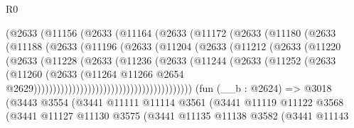 \begin{lexlean}{R0}
\begin{coremodule}
                          (@2633
                            (@11156
                              (@2633
                                (@11164
                                  (@2633
                                    (@11172
                                      (@2633
                                        (@11180
                                          (@2633
                                            (@11188
                                              (@2633
                                                (@11196
                                                  (@2633
                                                    (@11204
                                                      (@2633
                                                        (@11212
                                                          (@2633
                                                            (@11220
                                                              (@2633
                                                                (@11228
                                                                  (@2633
                                                                    (@11236
                                                                      (@2633
                                                                        (@11244
                                                                          (@2633
                                                                            (@11252
                                                                              (@2633
                                                                                (@11260
                                                                                  (@2633
                                                                                    (@11264
                                                                                      @11266
                                                                                      @2654
                                                                                      @2629)))))))))))))))))))))))))))))))))))))))))
    (fun (__b : @2624) =>
    @3018
      (@3443
        @3554
        (@3441
          @11111
          @11114
          @3561
          (@3441
            @11119
            @11122
            @3568
            (@3441
              @11127
              @11130
              @3575
              (@3441
                @11135
                @11138
                @3582
                (@3441
                  @11143

\end{coremodule}
\end{lexlean}
